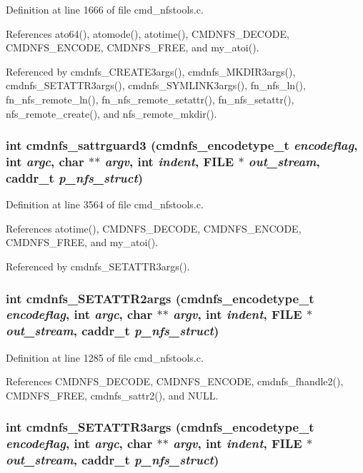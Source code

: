 Definition at line 1666 of file cmd\_\-nfstools.c.

References ato64(), atomode(), atotime(), CMDNFS\_\-DECODE, CMDNFS\_\-ENCODE, CMDNFS\_\-FREE, and my\_\-atoi().

Referenced by cmdnfs\_\-CREATE3args(), cmdnfs\_\-MKDIR3args(), cmdnfs\_\-SETATTR3args(), cmdnfs\_\-SYMLINK3args(), fn\_\-nfs\_\-ln(), fn\_\-nfs\_\-remote\_\-ln(), fn\_\-nfs\_\-remote\_\-setattr(), fn\_\-nfs\_\-setattr(), nfs\_\-remote\_\-create(), and nfs\_\-remote\_\-mkdir().
\subsubsection{\setlength{\rightskip}{0pt plus 5cm}int cmdnfs\_\-sattrguard3 ({\bf cmdnfs\_\-encodetype\_\-t} {\em encodeflag}, int {\em argc}, char $\ast$$\ast$ {\em argv}, int {\em indent}, FILE $\ast$ {\em out\_\-stream}, caddr\_\-t {\em p\_\-nfs\_\-struct})}\label{cmd__nfstools_8c_a108}




Definition at line 3564 of file cmd\_\-nfstools.c.

References atotime(), CMDNFS\_\-DECODE, CMDNFS\_\-ENCODE, CMDNFS\_\-FREE, and my\_\-atoi().

Referenced by cmdnfs\_\-SETATTR3args().
\subsubsection{\setlength{\rightskip}{0pt plus 5cm}int cmdnfs\_\-SETATTR2args ({\bf cmdnfs\_\-encodetype\_\-t} {\em encodeflag}, int {\em argc}, char $\ast$$\ast$ {\em argv}, int {\em indent}, FILE $\ast$ {\em out\_\-stream}, caddr\_\-t {\em p\_\-nfs\_\-struct})}\label{cmd__nfstools_8c_a76}




Definition at line 1285 of file cmd\_\-nfstools.c.

References CMDNFS\_\-DECODE, CMDNFS\_\-ENCODE, cmdnfs\_\-fhandle2(), CMDNFS\_\-FREE, cmdnfs\_\-sattr2(), and NULL.
\subsubsection{\setlength{\rightskip}{0pt plus 5cm}int cmdnfs\_\-SETATTR3args ({\bf cmdnfs\_\-encodetype\_\-t} {\em encodeflag}, int {\em argc}, char $\ast$$\ast$ {\em argv}, int {\em indent}, FILE $\ast$ {\em out\_\-stream}, caddr\_\-t {\em p\_\-nfs\_\-struct})}\label{cmd__nfstools_8c_a109}




